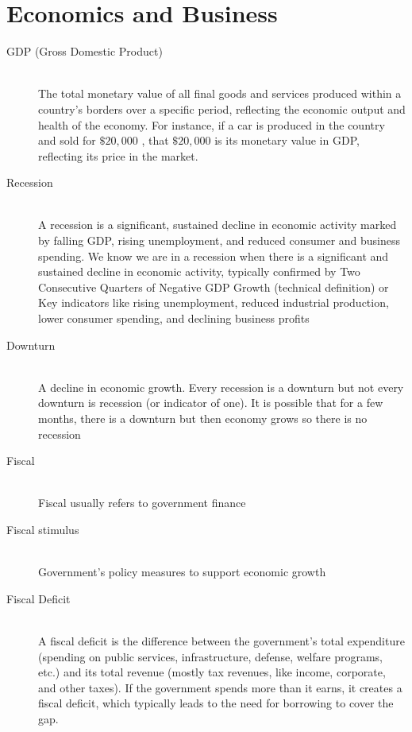\section{Economics and Business}

\begin{description}
    \item[GDP (Gross Domestic Product)] \hfill \\ The total monetary value of all final goods and services produced within a country’s borders over a specific period, reflecting the economic output and health of the economy. For instance, if a car is produced in the country and sold for $\mathdollar 20,000$ , that $\mathdollar 20,000$ is its monetary value in GDP, reflecting its price in the market.
    
    \item[Recession] \hfill \\ A recession is a significant, sustained decline in economic activity marked by falling GDP, rising unemployment, and reduced consumer and business spending. We know we are in a recession when there is a significant and sustained decline in economic activity, typically confirmed by Two Consecutive Quarters of Negative GDP Growth (technical definition) or Key indicators like rising unemployment, reduced industrial production, lower consumer spending, and declining business profits
    
    \item[Downturn] \hfill \\ A decline in economic growth. Every recession is a downturn but not every downturn is recession (or indicator of one). It is possible that for a few months, there is a downturn but then economy grows so there is no recession
    \item[Fiscal] \hfill \\ Fiscal usually refers to government finance
    \item[Fiscal stimulus] \hfill \\ Government's policy measures to support economic growth 
    \item[Fiscal Deficit] \hfill \\ A fiscal deficit is the difference between the government's total expenditure (spending on public services, infrastructure, defense, welfare programs, etc.) and its total revenue (mostly tax revenues, like income, corporate, and other taxes). If the government spends more than it earns, it creates a fiscal deficit, which typically leads to the need for borrowing to cover the gap.
    

\end{description}
